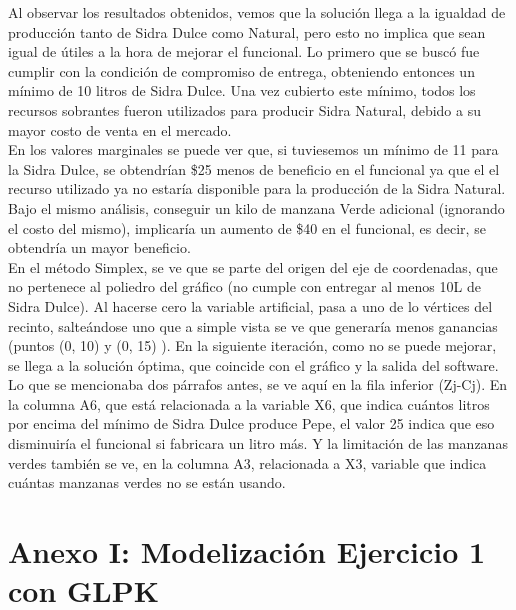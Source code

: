 \documentclass[a4paper,10pt]{article}
\begin{document}
Al observar los resultados obtenidos, vemos que la soluci\'on llega a la igualdad de producci\'on tanto de Sidra Dulce como Natural, pero esto no implica que sean igual de \'utiles a la hora de mejorar el funcional. Lo primero que se busc\'o fue cumplir con la condici\'on de compromiso de entrega, obteniendo entonces un m\'inimo de 10 litros de Sidra Dulce. Una vez cubierto este m\'inimo, todos los recursos sobrantes fueron utilizados para producir Sidra Natural, debido a su mayor costo de venta en el mercado.\\

En los valores marginales se puede ver que, si tuviesemos un m\'inimo de 11 para la Sidra Dulce, se obtendr\'ian \$25 menos de beneficio en el funcional ya que el el recurso utilizado ya no estar\'ia disponible para la producci\'on de la Sidra Natural. Bajo el mismo an\'alisis, conseguir un kilo de manzana Verde adicional (ignorando el costo del mismo), implicar\'ia un aumento de \$40 en el funcional, es decir, se obtendr\'ia un mayor beneficio.\\

En el m\'etodo Simplex, se ve que se parte del origen del eje de coordenadas, que no pertenece al poliedro del gr\'afico (no cumple con entregar al menos 10L de Sidra Dulce). Al hacerse cero la variable artificial, pasa a uno de lo v\'ertices del recinto, salte\'andose uno que a simple vista se ve que generar\'ia menos ganancias (puntos (0, 10) y (0, 15) ).
En la siguiente iteraci\'on, como no se puede mejorar, se llega a la soluci\'on \'optima, que coincide con el gr\'afico y la salida del software.\\

Lo que se mencionaba dos p\'arrafos antes, se ve aqu\'i en la fila inferior (Zj-Cj). En la columna A6, que est\'a relacionada a la variable X6, que indica cu\'antos litros por encima del m\'inimo de Sidra Dulce produce Pepe, el valor 25 indica que eso disminuir\'ia el funcional si fabricara un litro m\'as. Y la limitaci\'on de las manzanas verdes tambi\'en se ve, en la columna A3, relacionada a X3, variable que indica cu\'antas manzanas verdes no se est\'an usando.


\newpage

\section{Anexo I: Modelizaci\'on Ejercicio 1 con GLPK}
\end{document}
